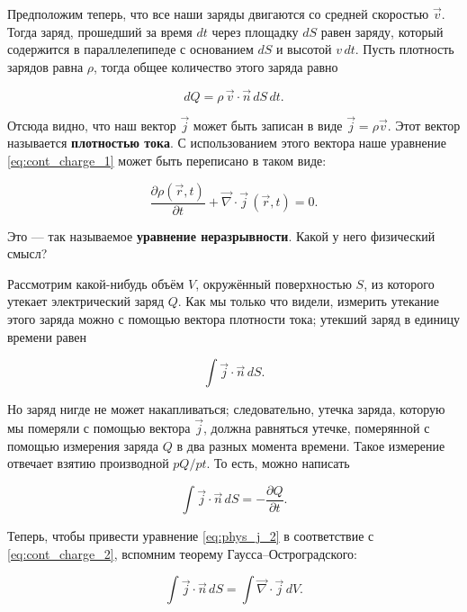 \documentclass[a4paper,12pt]{article}
\numberwithin{equation}{section}
\newcommand{\pt}{\partial}
\newcommand{\vn}{\vec{\nabla}}
\begin{document}
Предположим теперь, что все наши заряды двигаются со средней скоростью
$\vec{v}$. Тогда заряд, прошедший за время $dt$ через площадку $dS$
равен заряду, который содержится в параллелепипеде с основанием $dS$ и
высотой $v\, dt$. Пусть плотность зарядов равна $\rho$, тогда общее
количество этого заряда равно

\begin{equation}
  \label{eq:def_j_2}
  dQ = \rho \, \vec{v} \cdot \vec{n} \, dS\, dt.
\end{equation}

Отсюда видно, что наш вектор $\vec{j}$ может быть записан в виде
$\vec{j} = \rho \vec{v}$. Этот вектор называется \textbf{плотностью
  тока}. С использованием этого вектора наше уравнение
\eqref{eq:cont_charge_1} может быть переписано в таком виде: 

\begin{equation}
  \label{eq:cont_charge_2}
  \frac{\pt \rho (\vec{r},t)}{\pt t} + \vn \cdot \vec{j} \,(\vec{r},t)=0.
\end{equation}

Это — так называемое \textbf{уравнение неразрывности}. Какой у него
физический смысл? 

Рассмотрим какой-нибудь объём $V$, окружённый поверхностью $S$, из
которого утекает электрический заряд $Q$. Как мы только что видели,
измерить утекание этого заряда можно с помощью вектора плотности тока;
утекший заряд в единицу времени равен 

\begin{equation}
  \label{eq:phys_j_1}
  \int \vec{j} \cdot \vec{n}\, dS. 
\end{equation}

Но заряд нигде не может накапливаться; следовательно, утечка заряда,
которую мы померяли с помощью вектора $\vec{j}$, должна равняться
утечке, померянной с помощью измерения заряда $Q$ в два разных момента
времени. Такое измерение отвечает взятию производной $pQ/pt$. То есть,
можно написать

\begin{equation}
  \label{eq:phys_j_2}
  \int \vec{j} \cdot \vec{n}\, dS = -\frac{\pt Q}{\pt t}.  
\end{equation}

Теперь, чтобы привести уравнение \eqref{eq:phys_j_2} в соответствие с
\eqref{eq:cont_charge_2}, вспомним теорему Гаусса--Остроградского: 

\begin{equation}
  \label{eq:phys_j_3}
   \int \vec{j} \cdot \vec{n}\, dS = \int \vn \cdot \vec{j}\, dV.
\end{equation}
\end{document}
